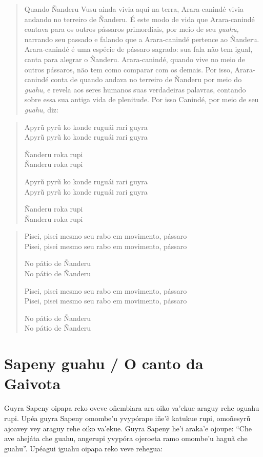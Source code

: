 \begin{quote}
Quando Ñanderu Vusu ainda vivia aqui na terra, Arara-canindé vivia
andando no terreiro de Ñanderu. É este modo de vida que Arara-canindé
contava para os outros pássaros primordiais, por meio de seu
\emph{guahu,} narrando seu passado e falando que a Arara-canindé
pertence ao Ñanderu. Arara-canindé é uma espécie de pássaro sagrado: sua
fala não tem igual, canta para alegrar o Ñanderu. Arara-canindé, quando
vive no meio de outros pássaros, não tem como comparar com os demais.
Por isso, Arara-canindé conta de quando andava no terreiro de Ñanderu
por meio do \emph{guahu}, e revela aos seres humanos suas verdadeiras
palavras, contando sobre essa sua antiga vida de plenitude. Por isso
Canindé, por meio de seu \emph{guahu}, diz:
\end{quote}

\begin{verse}
Apyrũ pyrũ ko konde ruguái rari guyra\\
Apyrũ pyrũ ko konde ruguái rari guyra

Ñanderu roka rupi\\
Ñanderu roka rupi

Apyrũ pyrũ ko konde ruguái rari guyra\\
Apyrũ pyrũ ko konde ruguái rari guyra

Ñanderu roka rupi\\
Ñanderu roka rupi
\end{verse}

\begin{verse}
Pisei, pisei mesmo seu rabo em movimento, pássaro\\
Pisei, pisei mesmo seu rabo em movimento, pássaro

No pátio de Ñanderu\\
No pátio de Ñanderu

Pisei, pisei mesmo seu rabo em movimento, pássaro\\
Pisei, pisei mesmo seu rabo em movimento, pássaro

No pátio de Ñanderu\\
No pátio de Ñanderu
\end{verse}

\chapter{Sapeny guahu / O canto da Gaivota}

Guyra Sapeny oipapa reko oveve oñembiara ara oiko va'ekue araguy rehe
oguahu rupi. Upéa guyra Sapeny omombe'u yvypórape iñe'ẽ katukue rupi,
omoñesyrũ ajoavey vey araguy rehe oiko va'ekue. Guyra Sapeny he'i
araka'e ojoupe: ``Che ave ahejáta che guahu, angerupi yvypóra ojeroeta
ramo omombe'u haguã che guahu''. Upéagui iguahu oipapa reko veve
rehegua:

